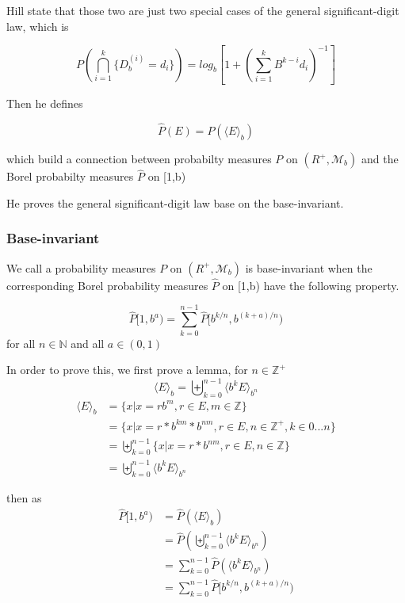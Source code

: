 \documentclass[12pt]{article}
\begin{document}
Hill state that those two are just two special cases of the general significant-digit law, which is 

$$P(\bigcap^k_{i=1}\{D^{(i)}_b=d_i\})=log_b[1+(\sum^k_{i=1}B^{k-i}d_i)^{-1}]$$

Then he defines

$$\widehat P(E)=P(\langle E \rangle_b)$$

which build a connection between probabilty measures $P$ on $(R^+,\mathscr{M}_b)$ and the Borel probabilty measures $\widehat P$ on [1,b)

He proves the general significant-digit law base on the base-invariant.

\subsubsection{Base-invariant}



We call a probability measures $P$ on $(R^+,\mathscr{M}_b)$ is base-invariant when the corresponding Borel probability measures $\widehat P$ on [1,b) have the following property.

$$\widehat P[1,b^a)=\sum^{n-1}_{k=0}\widehat P[b^{k/n},b^{(k+a)/n})$$ 
for all $n\in \mathbb N$ and all $a\in (0,1)$

In order to prove this, we first prove a lemma, for $n\in \mathbb{Z}^+$
$$\langle E\rangle_b = \biguplus^{n-1}_{k=0}\langle b^kE\rangle_{b^n}$$
\begin{equation*}
\begin{aligned}
\langle E\rangle_b&=\lbrace x|x=rb^m,r\in E, m\in \mathbb{Z}\rbrace\\
&=\lbrace x|x=r*b^{km}*b^{nm},r\in E, n\in \mathbb{Z}^+,k\in{0...n}\rbrace\\
&=\biguplus^{n-1}_{k=0}\lbrace x|x=r*b^{nm},r\in E, n\in \mathbb{Z}\rbrace\\
&=\biguplus^{n-1}_{k=0}\langle b^kE\rangle_{b^n}
\end{aligned}
\end{equation*}

then as 
\begin{equation*}
\begin{aligned}
\widehat P[1,b^a)&=\widehat P(\langle E\rangle_b )\\
&=\widehat P(\biguplus^{n-1}_{k=0}\langle b^kE\rangle_{b^n})\\
&=\sum^{n-1}_{k=0}\widehat P(\langle b^kE\rangle_{b^n})\\
&=\sum^{n-1}_{k=0}\widehat P[b^{k/n},b^{(k+a)/n})
\end{aligned}
\end{equation*}
\end{document}
